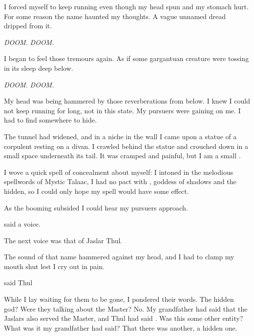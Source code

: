 \documentclass
  [a4paper,
   12pt,
   oneside
  ]%
  {article}
\begin{document}
I forced myself to keep running even though my head spun and my stomach hurt. 
For some reason the name \emph{\Ubloth} haunted my thoughts. 
A vague unnamed dread dripped from it.

\emph{DOOM.}
\emph{DOOM.}

I began to feel those tremours again.
As if some gargantuan creature were tossing in its sleep deep below.

\emph{DOOM.} 
\emph{DOOM.}

My head was being hammered by those reverberations from below. 
I knew I could not keep running for long, not in this state. 
My pursuers were gaining on me. 
I had to find somewhere to hide. 

The tunnel had widened, and in a niche in the wall I came upon a statue of a corpulent \scatha resting on a divan.%
\index{\scatha}
I crawled behind the statue and crouched down in a small space underneath its tail.
It was cramped and painful, but I am a small \scatha. 

I wove a quick spell of concealment about myself:
 I intoned in the melodious spellwords of Mystic Talaac, 
%
\index{\Nasshikerr}
I had no pact with \Nasshikerr, goddess of shadows and the hidden, so I could only hope my spell would have some effect. 

As the booming subsided I could hear my pursuers approach.

 said a voice.

The next voice was that of Jaslar Thul.

The sound of that name hammered against my head, and I had to clamp my mouth shut lest I cry out in pain.

 said Thul


While I lay waiting for them to be gone, I pondered their words.
The hidden god? 
Were they talking about the Master? 
No. 
My grandfather had said that the Jaslars also served the Master, and Thul had said .
Was this some other entity?
What was it my grandfather had said? 
That there was another, a hidden one.
\end{document}
